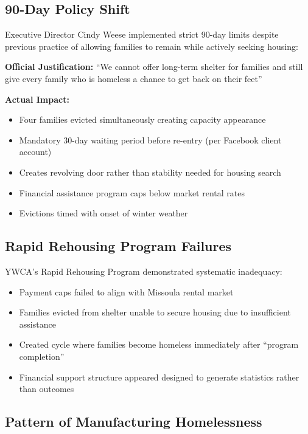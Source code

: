\documentclass[12pt,oneside]{article}
\begin{document}
\subsection*{90-Day Policy Shift}

Executive Director Cindy Weese implemented strict 90-day limits despite previous practice of allowing families to remain while actively seeking housing:

\textbf{Official Justification:} ``We cannot offer long-term shelter for families and still give every family who is homeless a chance to get back on their feet''

\textbf{Actual Impact:}
\begin{itemize}
\item Four families evicted simultaneously creating capacity appearance
\item Mandatory 30-day waiting period before re-entry (per Facebook client account)
\item Creates revolving door rather than stability needed for housing search
\item Financial assistance program caps below market rental rates
\item Evictions timed with onset of winter weather
\end{itemize}

\subsection*{Rapid Rehousing Program Failures}

YWCA's Rapid Rehousing Program demonstrated systematic inadequacy:

\begin{itemize}
\item Payment caps failed to align with Missoula rental market
\item Families evicted from shelter unable to secure housing due to insufficient assistance
\item Created cycle where families become homeless immediately after ``program completion''
\item Financial support structure appeared designed to generate statistics rather than outcomes
\end{itemize}

\subsection*{Pattern of Manufacturing Homelessness}
\end{document}
